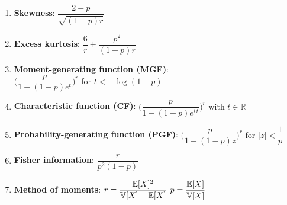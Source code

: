 \begin{enumerate}

    \item \textbf{Skewness}:
    $
         {\displaystyle {\dfrac {2-p}{\sqrt {(1-p)r}}}}
    $
    \hfill \cite{wiki/Negative_binomial_distribution}

    \item \textbf{Excess kurtosis}:
    $
         {\displaystyle {\dfrac {6}{r}}+{\dfrac {p^{2}}{(1-p)r}}}
    $
    \hfill \cite{wiki/Negative_binomial_distribution}


    \item \textbf{Moment-generating function (MGF)}:
    $
         {\displaystyle {\biggl (}{\dfrac {p}{1-(1-p)e^{t}}}{\biggr )}^{\!r}{\text{ for }}t<-\log(1-p)}
    $
    \hfill \cite{wiki/Negative_binomial_distribution}

    \item \textbf{Characteristic function (CF)}:
    $
         {\displaystyle {\biggl (}{\dfrac {p}{1-(1-p)e^{i\,t}}}{\biggr )}^{\!r}{\text{ with }}t\in \mathbb {R} }
    $
    \hfill \cite{wiki/Negative_binomial_distribution}

    \item \textbf{Probability-generating function (PGF)}:
    $
         {\displaystyle {\biggl (}{\dfrac {p}{1-(1-p)z}}{\biggr )}^{\!r}{\text{ for }}|z|<{\dfrac {1}{p}}}
    $
    \hfill \cite{wiki/Negative_binomial_distribution}

    \item \textbf{Fisher information}:
    $
         {\displaystyle {\dfrac {r}{p^{2}(1-p)}}}
    $
    \hfill \cite{wiki/Negative_binomial_distribution}

    \item \textbf{Method of moments}:
    $ {\displaystyle r={\dfrac {\mathbb{E}[X]^{2}}{\mathbb{V}[X]-\mathbb{E}[X]}}}$
    \hspace{1cm}
    $ {\displaystyle p={\dfrac {\mathbb{E}[X]}{\mathbb{V}[X]}}}$
    \hfill \cite{wiki/Negative_binomial_distribution}
\end{enumerate}







